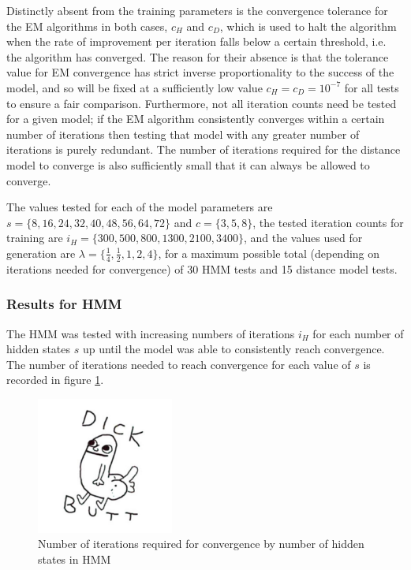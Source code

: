 \documentclass[ author={Stephen Livermore-Tozer},
				supervisor={Dr. Peter Flach},
				degree={MEng},
				title={Algorithmic Co-composition Using Machine Learning},
				subtitle={},
				type={research},
				year={2016} ]{dissertation}
\begin{document}
	Distinctly absent from the training parameters is the convergence tolerance for the EM algorithms in both cases, $c_H$ and $c_D$, which is used to halt the algorithm when the rate of improvement per iteration falls below a certain threshold, i.e. the algorithm has converged. The reason for their absence is that the tolerance value for EM convergence has strict inverse proportionality to the success of the model, and so will be fixed at a sufficiently low value $c_H = c_D = 10^{-7}$ for all tests to ensure a fair comparison. Furthermore, not all iteration counts need be tested for a given model; if the EM algorithm consistently converges within a certain number of iterations then testing that model with any greater number of iterations is purely redundant. The number of iterations required for the distance model to converge is also sufficiently small that it can always be allowed to converge. 
	
	The values tested for each of the model parameters are $s = \{8,16,24,32,40,48,56,64,72\}$ and $c = \{3,5,8\}$, the tested iteration counts for training are $i_H = \{300, 500, 800, 1300, 2100, 3400\}$, and the values used for generation are $\lambda = \{\frac{1}{4},\frac{1}{2},1,2,4\}$, for a maximum possible total (depending on iterations needed for convergence) of 30 HMM tests and 15 distance model tests.
	
	\subsubsection{Results for HMM}
	
	The HMM was tested with increasing numbers of iterations $i_H$ for each number of hidden states $s$ up until the model was able to consistently reach convergence. The number of iterations needed to reach convergence for each value of $s$ is recorded in figure \ref{fig:hmm-iterations-convergence}.
		
	\begin{figure}[hl]
		\centering
		\includegraphics[width=0.4\textwidth]{filler}
		\caption{Number of iterations required for convergence by number of hidden states in HMM}
		\label{fig:hmm-iterations-convergence}
	\end{figure}
	
\end{document}
